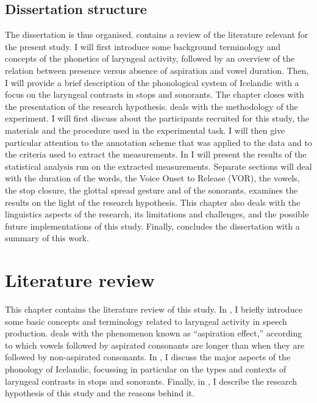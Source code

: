 \documentclass[11pt,a4paper,oneside,openany]{memoir}\usepackage[]{graphicx}\usepackage[]{color}
\begin{document}
\section{Dissertation structure}
The dissertation is thus organised.
 contains a review of the literature relevant for the present study.
I will first introduce some background terminology and concepts of the phonetics of laryngeal activity, followed by an overview of the relation between presence versus absence of aspiration and vowel duration.
Then, I will provide a brief description of the phonological system of Icelandic with a focus on the laryngeal contrasts in stops and sonorants.
The chapter closes with the presentation of the research hypothesis.
 deals with the methodology of the experiment.
I will first discuss about the participants recruited for this study, the materials and the procedure used in the experimental task.
I will then give particular attention to the annotation scheme that was applied to the data and to the criteria used to extract the measurements.
In  I will present the results of the statistical analysis run on the extracted measurements.
Separate sections will deal with the duration of the words, the Voice Onset to Release (VOR), the vowels, the stop closure, the glottal spread gesture and of the sonorants.
 examines the results on the light of the research hypothesis.
This chapter also deals with the linguistics aspects of the research, its limitations and challenges, and the possible future implementations of this study.
Finally,  concludes the dissertation with a summary of this work.



\chapter{Literature review}
\label{c:review}
This chapter contains the literature review of this study.
In , I briefly introduce some basic concepts and terminology related to laryngeal activity in speech production.
 deals with the phenomenon known as ``aspiration effect,'' according to which vowels followed by aspirated consonants are longer than when they are followed by non-aspirated consonants.
In , I discuss the major aspects of the phonology of Icelandic, focussing in particular on the types and contexts of laryngeal contrasts in stops and sonorants.
Finally, in , I describe the research hypothesis of this study and the reasons behind it.
\end{document}
